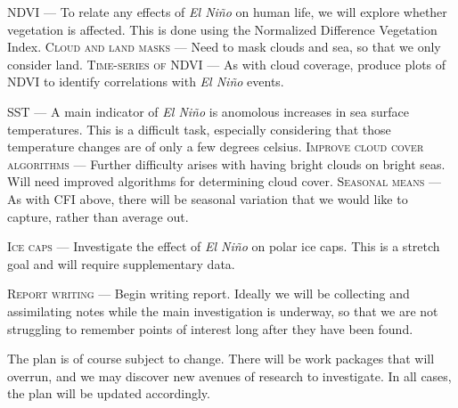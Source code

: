 \documentclass[12pt,preprint]{article}
\newcommand{\elnino}[0]{\emph{El Ni\~no}}
\newcommand{\workpackage}[2]{\textsc{#1} --- #2}
\begin{document}
\workpackage{NDVI}{To relate any effects of \elnino{} on human life,
  we will explore whether vegetation is affected. This is done using
  the Normalized Difference Vegetation Index.} \workpackage{Cloud and
  land masks}{Need to mask clouds and sea, so that we only consider
  land.} \workpackage{Time-series of NDVI}{As with cloud coverage,
  produce plots of NDVI to identify correlations with \elnino{}
  events.}

\vspace{.1cm}

\workpackage{SST}{A main indicator of \elnino{} is anomolous increases
  in sea surface temperatures. This is a difficult task, especially
  considering that those temperature changes are of only a few degrees
  celsius.} \workpackage{Improve cloud cover algorithms}{Further
  difficulty arises with having bright clouds on bright seas. Will
  need improved algorithms for determining cloud cover.}
\workpackage{Seasonal means}{As with CFI above, there will be seasonal
  variation that we would like to capture, rather than average out.}

\vspace{.1cm}

\workpackage{Ice caps}{Investigate the effect of \elnino{} on polar
  ice caps. This is a stretch goal and will require supplementary data.}

\vspace{.1cm}

\workpackage{Report writing}{Begin writing report. Ideally we will be
  collecting and assimilating notes while the main investigation is
  underway, so that we are not struggling to remember points of
  interest long after they have been found.}

\vspace{.1cm}

The plan is of course subject to change. There will be work packages
that will overrun, and we may discover new avenues of research to
investigate. In all cases, the plan will be updated accordingly.
\end{document}
